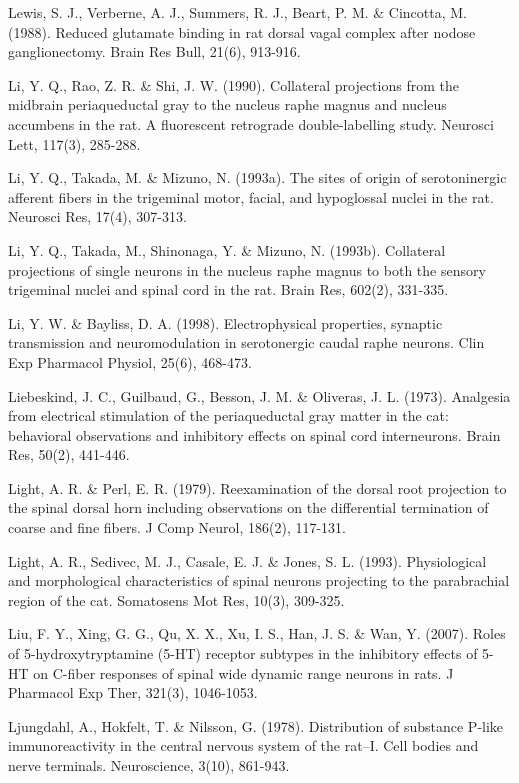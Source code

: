 \documentclass[a4paper,12pt,twoside]{report}
\begin{document}
\begin{singlespacing}
\begin{footnotesize}
Lewis, S. J., Verberne, A. J., Summers, R. J., Beart, P. M. \& Cincotta, M. (1988). Reduced glutamate binding in rat dorsal vagal complex after nodose ganglionectomy. Brain Res Bull, 21(6), 913-916.

Li, Y. Q., Rao, Z. R. \& Shi, J. W. (1990). Collateral projections from the midbrain periaqueductal gray to the nucleus raphe magnus and nucleus accumbens in the rat. A fluorescent retrograde double-labelling study. Neurosci Lett, 117(3), 285-288.

Li, Y. Q., Takada, M. \& Mizuno, N. (1993a). The sites of origin of serotoninergic afferent fibers in the trigeminal motor, facial, and hypoglossal nuclei in the rat. Neurosci Res, 17(4), 307-313.

Li, Y. Q., Takada, M., Shinonaga, Y. \& Mizuno, N. (1993b). Collateral projections of single neurons in the nucleus raphe magnus to both the sensory trigeminal nuclei and spinal cord in the rat. Brain Res, 602(2), 331-335.

Li, Y. W. \& Bayliss, D. A. (1998). Electrophysical properties, synaptic transmission and neuromodulation in serotonergic caudal raphe neurons. Clin Exp Pharmacol Physiol, 25(6), 468-473.

Liebeskind, J. C., Guilbaud, G., Besson, J. M. \& Oliveras, J. L. (1973). Analgesia from electrical stimulation of the periaqueductal gray matter in the cat: behavioral observations and inhibitory effects on spinal cord interneurons. Brain Res, 50(2), 441-446.

Light, A. R. \& Perl, E. R. (1979). Reexamination of the dorsal root projection to the spinal dorsal horn including observations on the differential termination of coarse and fine fibers. J Comp Neurol, 186(2), 117-131.

Light, A. R., Sedivec, M. J., Casale, E. J. \& Jones, S. L. (1993). Physiological and morphological characteristics of spinal neurons projecting to the parabrachial region of the cat. Somatosens Mot Res, 10(3), 309-325.

Liu, F. Y., Xing, G. G., Qu, X. X., Xu, I. S., Han, J. S. \& Wan, Y. (2007). Roles of 5-hydroxytryptamine (5-HT) receptor subtypes in the inhibitory effects of 5-HT on C-fiber responses of spinal wide dynamic range neurons in rats. J Pharmacol Exp Ther, 321(3), 1046-1053.

Ljungdahl, A., Hokfelt, T. \& Nilsson, G. (1978). Distribution of substance P-like immunoreactivity in the central nervous system of the rat--I. Cell bodies and nerve terminals. Neuroscience, 3(10), 861-943.


\end{footnotesize}
\end{singlespacing}
\end{document}
